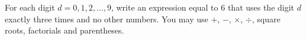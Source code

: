 For each digit $d=0,1,2,\dots,9$, write an expression equal to $6$ that uses the digit $d$ exactly three times and no other numbers. You may use $+$, $-$, $\times$, $\div$, square roots, factorials and parentheses.
